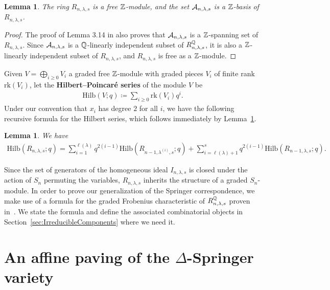 \documentclass[11pt]{amsart}
\newtheorem{lemma}[theorem]{Lemma}     %
\theoremstyle{definition}
\newcommand{\Hilb}{\mathrm{Hilb}}
\newcommand{\la}{\lambda}
\begin{document}
\begin{lemma}\label{lem:FreeZMod}
The ring $R_{n,\la,s}$ is a free $\mathbb{Z}$-module, and the set $\cA_{n,\la,s}$ is a $\mathbb{Z}$-basis of $R_{n,\la,s}$.
\end{lemma}
\begin{proof}
The proof of Lemma 3.14 in \cite{GriffinOSP} also proves that $\cA_{n,\la,s}$ is a $\mathbb{Z}$-spanning set of $R_{n,\la,s}$. Since $\cA_{n,\la,s}$ is a $\mathbb{Q}$-linearly independent subset of $R_{n,\la,s}^\bQ$, it is also a $\mathbb{Z}$-linearly independent subset of $R_{n,\la,s}$, and $R_{n,\la,s}$ is free as a $\mathbb{Z}$-module.
\end{proof}

Given $V = \bigoplus_{i\geq 0} V_i$ a graded free $\mathbb{Z}$-module with graded pieces $V_i$ of finite rank $\mathrm{rk}(V_i)$, let the \textbf{Hilbert--Poincar\'e series} of the module $V$ be 
\begin{align}
    \Hilb(V;q) \coloneqq \sum_{i\geq 0} \mathrm{rk}(V_i)q^i.
\end{align}
Under our convention that $x_i$ has degree $2$ for all $i$, we have the following recursive formula for the Hilbert series, which follows immediately by Lemma~\ref{lem:FreeZMod}.
\begin{lemma}\label{lem:RHilbRecursion}
We have
\begin{align}
    \Hilb(R_{n,\la,s};q) = \sum_{i=1}^{\ell(\la)} q^{2(i-1)} \Hilb(R_{n-1,\la^{(i)},s};q) + \sum_{i=\ell(\la)+1}^s q^{2(i-1)} \Hilb(R_{n-1,\la,s};q).
\end{align}
\end{lemma}

Since the set of generators of the homogeneous ideal $I_{n,\la,s}$ is closed under the action of $S_n$ permuting the variables, $R_{n,\la,s}$ inherits the structure of a graded $S_n$-module. In order to prove our generalization of the Springer correspondence, we make use of a formula for the graded Frobenius characteristic of $R_{n,\la,s}^\bQ$ proven in~\cite{GriffinOSP}. We state the formula and define the associated combinatorial objects in Section~\ref{sec:IrreducibleComponents} where we need it.




\section{An affine paving of the \texorpdfstring{$\Delta$}{Delta}-Springer variety}\label{sec:AffinePaving}
\end{document}

